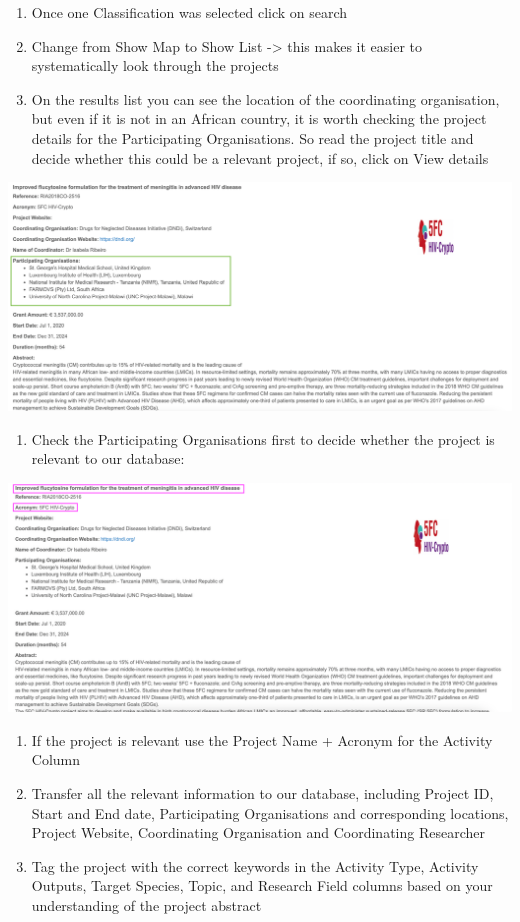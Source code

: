 \documentclass[
]{book}
\providecommand{\tightlist}{%
  \setlength{\itemsep}{0pt}\setlength{\parskip}{0pt}}
\begin{document}
\begin{enumerate}
\def\labelenumi{\arabic{enumi}.}
\setcounter{enumi}{2}
\item
  Once one Classification was selected click on search
\item
  Change from Show Map to Show List -\textgreater{} this makes it easier to systematically look through the projects
\item
  On the results list you can see the location of the coordinating organisation, but even if it is not in an African country, it is worth checking the project details for the Participating Organisations. So read the project title and decide whether this could be a relevant project, if so, click on View details
\end{enumerate}

\includegraphics{images/edctp1.png}

\begin{enumerate}
\def\labelenumi{\arabic{enumi}.}
\setcounter{enumi}{5}
\tightlist
\item
  Check the Participating Organisations first to decide whether the project is relevant to our database:
\end{enumerate}

\includegraphics{images/edctp2.png}

\begin{enumerate}
\def\labelenumi{\arabic{enumi}.}
\setcounter{enumi}{6}
\item
  If the project is relevant use the Project Name + Acronym for the Activity Column
\item
  Transfer all the relevant information to our database, including Project ID, Start and End date, Participating Organisations and corresponding locations, Project Website, Coordinating Organisation and Coordinating Researcher
\item
  Tag the project with the correct keywords in the Activity Type, Activity Outputs, Target Species, Topic, and Research Field columns based on your understanding of the project abstract
\end{enumerate}
\end{document}
